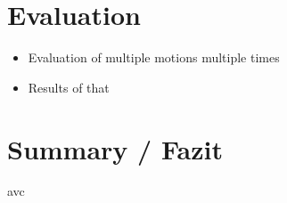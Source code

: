 \documentclass[	pdftex, 
								a4paper,
								11pt, DIV11, BCOR5mm,
								parskip,
								]{scrreprt}
\begin{document}
	\chapter*{Evaluation}
	\begin{itemize}
		\item Evaluation of multiple motions multiple times
		\item Results of that
	\end{itemize}
	\chapter*{Summary / Fazit}
avc
\end{document}
